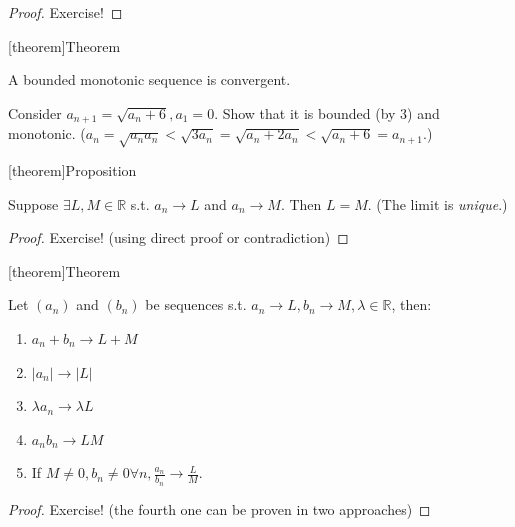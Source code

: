 \documentclass[12pt]{report}
\theoremstyle{definition}
\begin{document}
\begin{proof}
    Exercise!
\end{proof}

[theorem]{Theorem}
\begin{bounded monotonic sequence is convergent}
    A bounded monotonic sequence is convergent.
\end{bounded monotonic sequence is convergent}

\begin{ex}
    Consider $a_{n + 1} = \sqrt{a_n + 6}, a_1 = 0$. 
    Show that it is bounded (by 3) and monotonic.
    ($a_n = \sqrt{a_n a_n} < \sqrt{3a_n} = \sqrt{a_n + 2a_n} < \sqrt{a_n + 6} = a_{n + 1}$.)
\end{ex}


[theorem]{Proposition}
\begin{limit of convergence is unique}
    Suppose $\exists L, M \in \mathbb{R}$ s.t. $a_n \rightarrow{}L$ and $a_n \rightarrow{}M$.
    Then $L = M$. (The limit is \emph{unique}.)
\end{limit of convergence is unique}

\begin{proof}
    Exercise! (using direct proof or contradiction)
\end{proof}

[theorem]{Theorem}
\begin{algebra of limits of sequences}
    Let $(a_n)$ and $(b_n)$ be sequences s.t. $a_n \rightarrow{}L, b_n \rightarrow{}M, \lambda\in\mathbb{R}$, then:
    \begin{enumerate}[label = (\arabic*)]
        \item $a_n + b_n \rightarrow{}L + M$
        \item $|a_n| \rightarrow{}|L|$
        \item $\lambda a_n \rightarrow{}\lambda L$
        \item $a_n b_n \rightarrow{} LM$
        \item If $M \neq 0, b_n \neq 0 \forall n, \frac{a_n}{b_n} \rightarrow{}\frac{L}{M}$.
    \end{enumerate}
    
\end{algebra of limits of sequences}

\begin{proof}
    Exercise! (the fourth one can be proven in two approaches)
\end{proof}
\end{document}
